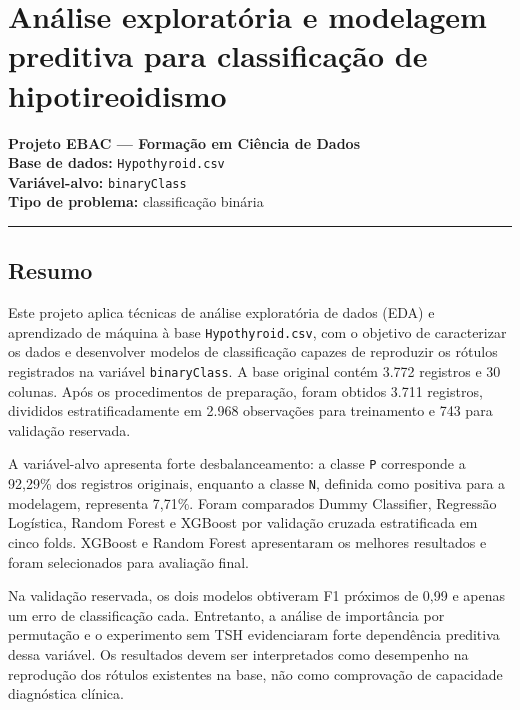 \documentclass[
]{article}
\author{}
\date{}
\begin{document}
\hypertarget{anuxe1lise-exploratuxf3ria-e-modelagem-preditiva-para-classificauxe7uxe3o-de-hipotireoidismo}{%
\section{Análise exploratória e modelagem preditiva para classificação
de
hipotireoidismo}\label{anuxe1lise-exploratuxf3ria-e-modelagem-preditiva-para-classificauxe7uxe3o-de-hipotireoidismo}}

\textbf{Projeto EBAC --- Formação em Ciência de Dados}\\
\textbf{Base de dados:} \texttt{Hypothyroid.csv}\\
\textbf{Variável-alvo:} \texttt{binaryClass}\\
\textbf{Tipo de problema:} classificação binária

\begin{center}\rule{0.5\linewidth}{0.5pt}\end{center}

\hypertarget{resumo}{%
\subsection{Resumo}\label{resumo}}

Este projeto aplica técnicas de análise exploratória de dados (EDA) e
aprendizado de máquina à base \texttt{Hypothyroid.csv}, com o objetivo
de caracterizar os dados e desenvolver modelos de classificação capazes
de reproduzir os rótulos registrados na variável \texttt{binaryClass}. A
base original contém 3.772 registros e 30 colunas. Após os procedimentos
de preparação, foram obtidos 3.711 registros, divididos
estratificadamente em 2.968 observações para treinamento e 743 para
validação reservada.

A variável-alvo apresenta forte desbalanceamento: a classe \texttt{P}
corresponde a 92,29\% dos registros originais, enquanto a classe
\texttt{N}, definida como positiva para a modelagem, representa 7,71\%.
Foram comparados Dummy Classifier, Regressão Logística, Random Forest e
XGBoost por validação cruzada estratificada em cinco folds. XGBoost e
Random Forest apresentaram os melhores resultados e foram selecionados
para avaliação final.

Na validação reservada, os dois modelos obtiveram F1 próximos de 0,99 e
apenas um erro de classificação cada. Entretanto, a análise de
importância por permutação e o experimento sem TSH evidenciaram forte
dependência preditiva dessa variável. Os resultados devem ser
interpretados como desempenho na reprodução dos rótulos existentes na
base, não como comprovação de capacidade diagnóstica clínica.
\end{document}

